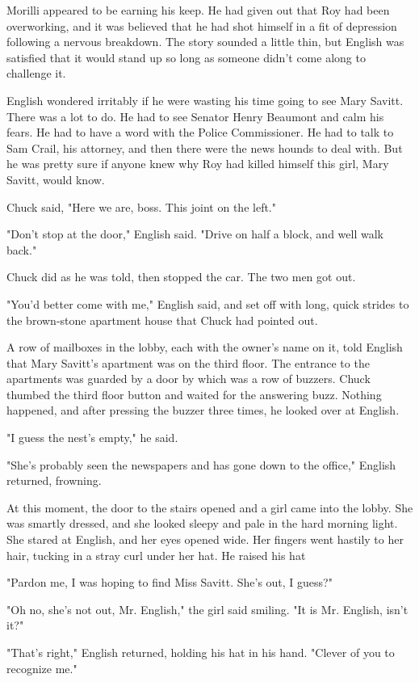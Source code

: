 \documentclass{novel}
\begin{document}
Morilli appeared to be earning his keep. He had given out that Roy had been overworking, and it was believed that he had shot himself in a fit of depression following a nervous breakdown. The story sounded a little thin, but English was satisfied that it would stand up so long as someone didn't come along to challenge it.

English wondered irritably if he were wasting his time going to see Mary Savitt. There was a lot to do. He had to see Senator Henry Beaumont and calm his fears. He had to have a word with the Police Commissioner. He had to talk to Sam Crail, his attorney, and then there were the news hounds to deal with. But he was pretty sure if anyone knew why Roy had killed himself this girl, Mary Savitt, would know.

Chuck said, "Here we are, boss. This joint on the left."

"Don't stop at the door," English said. "Drive on half a block, and well walk back."

Chuck did as he was told, then stopped the car. The two men got out.

"You'd better come with me," English said, and set off with long, quick strides to the brown-stone apartment house that Chuck had pointed out.

A row of mailboxes in the lobby, each with the owner's name on it, told English that Mary Savitt's apartment was on the third floor. The entrance to the apartments was guarded by a door by which was a row of buzzers. Chuck thumbed the third floor button and waited for the answering buzz. Nothing happened, and after pressing the buzzer three times, he looked over at English.

"I guess the nest's empty," he said.

"She's probably seen the newspapers and has gone down to the office," English returned, frowning.

At this moment, the door to the stairs opened and a girl came into the lobby. She was smartly dressed, and she looked sleepy and pale in the hard morning light. She stared at English, and her eyes opened wide. Her fingers went hastily to her hair, tucking in a stray curl under her hat. He raised his hat

"Pardon me, I was hoping to find Miss Savitt. She's out, I guess?"

"Oh no, she's not out, Mr. English," the girl said smiling. "It is Mr. English, isn't it?"

"That's right," English returned, holding his hat in his hand. "Clever of you to recognize me."
\end{document}

